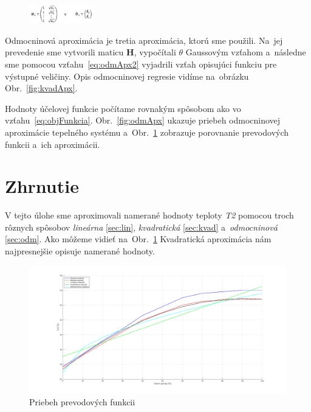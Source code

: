 \documentclass{article}
\begin{document}
\begin{figure}[!htbp]
	\begin{center}
		\includegraphics[width=0.25\textwidth]{include/defHandTheta3.png}
	\end{center}
\end{figure}

Odmocninová aproximácia je tretia aproximácia, ktorú sme použili.
Na~jej prevedenie sme vytvorili maticu \textbf{H}, vypočítali
\(\theta\) Gaussovým vzťahom a~následne sme pomocou vzťahu~\ref{eq:odmApx2}
vyjadrili vzťah opisujúci funkciu pre výstupné veličiny. Opis odmocninovej
regresie vidíme na~obrázku Obr.~\ref{fig:kvadApx}.

Hodnoty účelovej funkcie počítame rovnakým spôsobom ako vo vzťahu~\ref{eq:objFunkcia}.
Obr.~\ref{fig:odmApx} ukazuje priebeh odmocninovej aproximácie tepelného systému
a~Obr.~\ref{fig:prevod} zobrazuje porovnanie prevodových funkcii a~ich aproximácii.

\clearpage

\section{Zhrnutie}
\label{sec:zhrnutie}

V tejto úlohe sme aproximovali namerané hodnoty teploty \textit{T2} pomocou troch rôznych spôsobov
\textit{lineárna} \ref{sec:lin}, \textit{kvadratická} \ref{sec:kvad} a~\textit{odmocninová} \ref{sec:odm}.
Ako môžeme vidieť na~Obr.~\ref{fig:prevod} Kvadratická aproximácia nám najpresnejšie opisuje namerané hodnoty.

\begin{figure}[!htbp]
	\begin{center}
		\includegraphics[width=\textwidth]{./include/prevodove_funkcie2.png}
		\caption{Priebeh prevodových funkcii}
		\label{fig:prevod}
	\end{center}
	\hfill
\end{figure}
\end{document}

